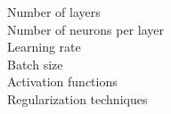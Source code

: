 \documentclass[preview]{standalone}
\begin{document}
Number of layers\\Number of neurons per layer\\Learning rate\\Batch size\\Activation functions\\Regularization techniques\\
\end{document}
